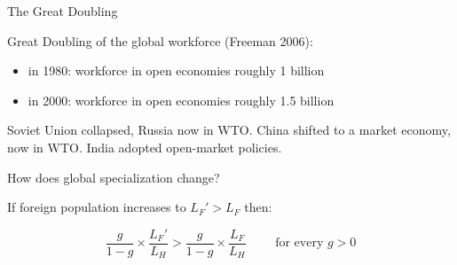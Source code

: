 \documentclass[notes,11pt, aspectratio=169, xcolor=table]{beamer}
\newenvironment{wideitemize}{\itemize\addtolength{\itemsep}{10pt}}{\enditemize}
\begin{document}
 
\begin{frame}{The Great Doubling}
\begin{wideitemize}
    \item<1-> Great Doubling of the global workforce (Freeman 2006):
    \begin{itemize}
        \item in 1980: workforce in open economies roughly 1 billion
        \item in 2000: workforce in open economies roughly 1.5 billion
    \end{itemize}

    \item<2-> Soviet Union collapsed, Russia now in WTO. China shifted to a market economy, now in WTO. India adopted open-market policies.

    \item<3-> How does global specialization change?

    \item<4-> If foreign population increases to $L_F'>L_F$ then:

    \begin{equation*}
        \frac{g}{1-g} \times \frac{L_F'}{L_H} > \frac{g}{1-g} \times \frac{L_F}{L_H} \qquad \text{ for every } g > 0
    \end{equation*}

    
        
    \end{wideitemize}
\end{frame}
\end{document}
